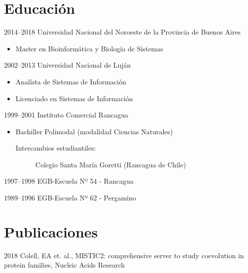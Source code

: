 \documentclass[a4paper]{article}
\begin{document}
\section{Educaci{\'o}n}
\begin{CV}
\item[2014--2018] Universidad Nacional del Noroeste de la Provincia de Buenos Aires
  \begin{itemize}
  \item Master en Bioinform{\'a}tica y Biolog{\'i}a de Sistemas
  \end{itemize}
\item[2002--2013] Universidad Nacional de Luj{\'a}n
  \begin{itemize}
  \item Anal{\'i}sta de Sistemas de Informaci{\'o}n
  \item Licenciado en Sistemas de Informaci{\'o}n
  \end{itemize}
\item[1999--2001] Instituto Comercial Rancagua
  \begin{itemize}
  \item Bachiller Polimodal (modalidad Ciencias Naturales)
  	\begin{description}
  	\item[Intercambios estudiantiles: ] Colegio Santa Mar{\'i}a Goretti (Rancagua de Chile)
  	\end{description}
  \end{itemize}
\item[1997--1998] EGB-Escuela Nº 54 - Rancagua
\item[1989--1996] EGB-Escuela Nº 62 - Pergamino
\end{CV}

\section{Publicaciones}
\begin{CV}
\item[2018] Colell, EA et. al., MISTIC2: comprehensive server to study coevolution in protein families, Nucleic Acids Research
\end{CV}
\end{document}
